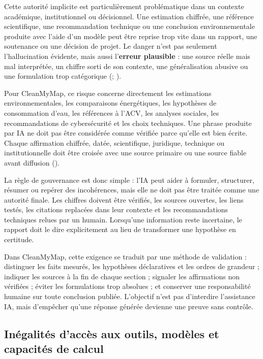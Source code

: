 \documentclass[
  10pt,
  a4paper,
  DIV=11,
  numbers=noendperiod,
  oneside]{scrreprt}
\let\oldtextbf\textbf
\renewcommand{\textbf}[1]{\oldtextbf{\textcolor{cmmnavy}{#1}}}
\begin{document}
Cette autorité implicite est particulièrement problématique dans un
contexte académique, institutionnel ou décisionnel. Une estimation
chiffrée, une référence scientifique, une recommandation technique ou
une conclusion environnementale produite avec l'aide d'un modèle peut
être reprise trop vite dans un rapport, une soutenance ou une décision
de projet. Le danger n'est pas seulement l'hallucination évidente, mais
aussi l'\textbf{erreur plausible} : une source réelle mais mal
interprétée, un chiffre sorti de son contexte, une généralisation
abusive ou une formulation trop catégorique
(;
).

Pour CleanMyMap, ce risque concerne directement les estimations
environnementales, les comparaisons énergétiques, les hypothèses de
consommation d'eau, les références à l'ACV, les analyses sociales, les
recommandations de cybersécurité et les choix techniques. Une phrase
produite par IA ne doit pas être considérée comme vérifiée parce qu'elle
est bien écrite. Chaque affirmation chiffrée, datée, scientifique,
juridique, technique ou institutionnelle doit être croisée avec une
source primaire ou une source fiable avant diffusion
().

La règle de gouvernance est donc simple : l'IA peut aider à formuler,
structurer, résumer ou repérer des incohérences, mais elle ne doit pas
être traitée comme une autorité finale. Les chiffres doivent être
vérifiés, les sources ouvertes, les liens testés, les citations
replacées dans leur contexte et les recommandations techniques relues
par un humain. Lorsqu'une information reste incertaine, le rapport doit
le dire explicitement au lieu de transformer une hypothèse en certitude.

Dans CleanMyMap, cette exigence se traduit par une méthode de validation
: distinguer les faits mesurés, les hypothèses déclaratives et les
ordres de grandeur ; indiquer les sources à la fin de chaque section ;
signaler les affirmations non vérifiées ; éviter les formulations trop
absolues ; et conserver une responsabilité humaine sur toute conclusion
publiée. L'objectif n'est pas d'interdire l'assistance IA, mais
d'empêcher qu'une réponse générée devienne une preuve sans contrôle.

\subsection{Inégalités d'accès aux outils, modèles et capacités de
calcul}\label{inuxe9galituxe9s-daccuxe8s-aux-outils-moduxe8les-et-capacituxe9s-de-calcul}
\end{document}
